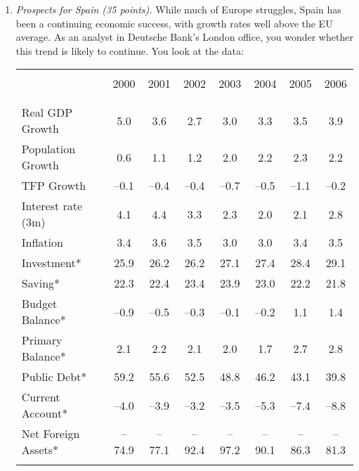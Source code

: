 \documentclass[letterpaper,12pt]{article}
\begin{document}
\begin{enumerate}

\item {\it Prospects for Spain (35 points).\/} 
While much of Europe struggles, Spain has been a continuing economic 
success, with growth rates well above the EU average.  
As an analyst in Deutsche Bank's London office, 
you wonder whether this trend is likely to continue.  
You look at the data:  

\begin{table}[h]
\vspace{1em}%
\centering%
\hspace{-3cm}%
\begin{minipage}
{0.52\textwidth}%
\begin{center}{\small
\begin{tabular}{lccccccc}%
\vspace{-0.6cm}\\
\hline%
\vspace{-.3cm}\\
                     & 2000  &  2001  &  2002   & 2003  & 2004 &  2005  &  2006 \\%
\vspace{-.3cm}\\
\hline%
\vspace{-.2cm}\\
Real GDP Growth      &  5.0   &   3.6  &   2.7   &  3.0  &  3.3  &   3.5  &  3.9 \\%
Population Growth    &  0.6   &   1.1  &    1.2  &  2.0  &  2.2  &   2.3  &  2.2 \\
TFP Growth           &  --0.1 &  --0.4 &   --0.4 &  --0.7&  --0.5&   --1.1&  --0.2\\%
Interest rate (3m)   &  4.1 &  4.4  &  3.3  &  2.3  & 2.0   &  2.1  &  2.8 \\
Inflation            &  3.4 &  3.6  &  3.5  &  3.0  &  3.0  &  3.4  &   3.5 \\
Investment*      &  25.9  &   26.2 &   26.2  &  27.1 &  27.4 &   28.4 &  29.1\\%
Saving*          &  22.3  &   22.4 &   23.4  &  23.9 &  23.0 &   22.2 &  21.8\\%
Budget Balance*       &  --0.9 &  --0.5 &   --0.3 &  --0.1&  --0.2&    1.1 &  1.4 \\%
Primary Balance*      &  2.1 &    2.2 &   2.1  &  2.0 &  1.7  &  2.7 &  2.8  \\%
Public Debt*          &  59.2  &  55.6  &   52.5  &  48.8 &  46.2 &   43.1 &  39.8\\%
Current Account*      &  --4.0 &  --3.9 &   --3.2 &  --3.5&  --5.3&   --7.4&  --8.8\\%
Net Foreign Assets*   & --74.9  & --77.1  & --92.4  & --97.2 & --90.1 & --86.3 &  --81.3 \\%
\hline%
\vspace{-3mm}\\
\end{tabular}
}
\end{center}
\end{minipage}
\end{table}


\end{enumerate}
\end{document}

